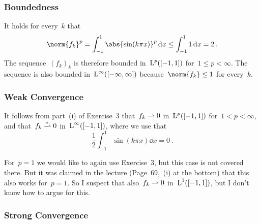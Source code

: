 \section{}





\subsection{}



\subsubsection{Boundedness}

It holds for every~$k$ that
\[
        \norm{f_k}^p
  =     \int_{-1}^1 \abs{\sin(k \pi x)}^p \dd{x}
  \leq  \int_{-1}^1 1 \dd{x}
  =     2 \,.
\]
The sequence~$(f_k)_k$ is therefore bounded in~$\operatorname{L}^p([-1,1])$ for~$1 \leq p < \infty$.
The sequence is also bounded in~$\operatorname{L}^\infty([-\infty,\infty])$ because~$\norm{f_k} \leq 1$ for every~$k$.



\subsubsection{Weak Convergence}

It follows from part~(i) of Exercise~3 that~$f_k \rightharpoonup 0$ in~$\operatorname{L}^p([-1,1])$ for~$1 < p < \infty$, and that~$f_k \wtostar 0$ in~$\operatorname{L}^\infty([-1,1])$, where we use that
\[
    \frac{1}{2} \int_{-1}^1 \sin(k \pi x) \dd{x}
  = 0 \,.
\]

For~$p = 1$ we would like to again use Exercise~3, but this case is not covered there.
But it was claimed in the lecture (Page~69,~(i) at the bottom) that this also works for~$p = 1$.
So I suspect that also~$f_k \rightharpoonup 0$ in~$\operatorname{L}^1([-1,1])$, but I don’t know how to argue for this.



\subsubsection{Strong Convergence}

